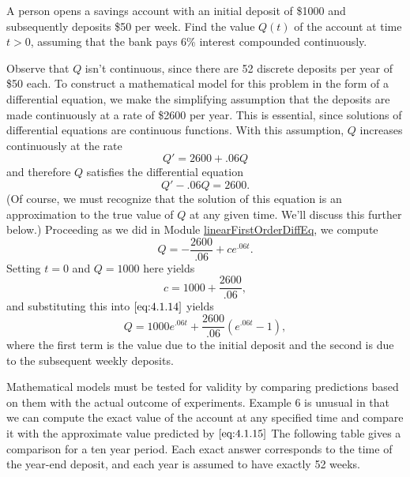 \documentclass{ximera}
\begin{document}
\begin{example}\label{example:4.1.6}
A person opens a savings account with an initial deposit of \$1000 and
subsequently deposits \$50 per week. Find the value $Q(t)$ of the
account at time $t > 0$, assuming that the bank pays 6\%
interest compounded continuously.
\begin{explanation}
Observe that $Q$ isn't  continuous, since there are 52
discrete deposits per year of \$50 each. To construct a mathematical
model for this problem in the form of a differential equation, we make
the simplifying assumption that the deposits are made continuously at
a rate of \$2600 per year. This is essential, since solutions of
differential equations are continuous functions. With this assumption,
$Q$ increases continuously at the rate
$$
Q'=2600+.06 Q
$$
and therefore $Q$ satisfies the differential equation
\begin{equation} \label{eq:4.1.13}
Q'-.06Q=2600.
\end{equation}
(Of course, we must recognize that the solution of this equation
is an approximation to the true value of $Q$ at any given time. We'll
discuss this further below.)  
Proceeding as we did in Module \href{https://ximera.osu.edu/ode/main/linearFirstOrderDiffEq/linearFirstOrderDiffEq}{linearFirstOrderDiffEq}, we compute
\begin{equation} \label{eq:4.1.14}
Q=-\frac{2600}{.06}+ce^{.06t}.
\end{equation}
 Setting $t=0$ and $Q=1000$ here yields
$$
c=1000+\frac{2600}{.06},
$$
and substituting this into $\eqref{eq:4.1.14}$ yields
\begin{equation} \label{eq:4.1.15}
Q=1000e^{.06t}+\frac{2600}{.06}(e^{.06t}-1),%
\end{equation}
where the first term is the value due to the initial deposit and the
second is due to the subsequent weekly deposits.
\end{explanation}
\end{example}

Mathematical models must be tested for validity by comparing
predictions based on them with the actual outcome of experiments.
Example 6 is unusual in that we can compute the exact value of the
account at any specified time and compare it with the approximate
value predicted by $\eqref{eq:4.1.15}$ %
The following table gives a comparison for a ten year period. Each exact answer corresponds to the time of the year-end deposit, and each year is assumed to have exactly 52 weeks.
\end{document}
